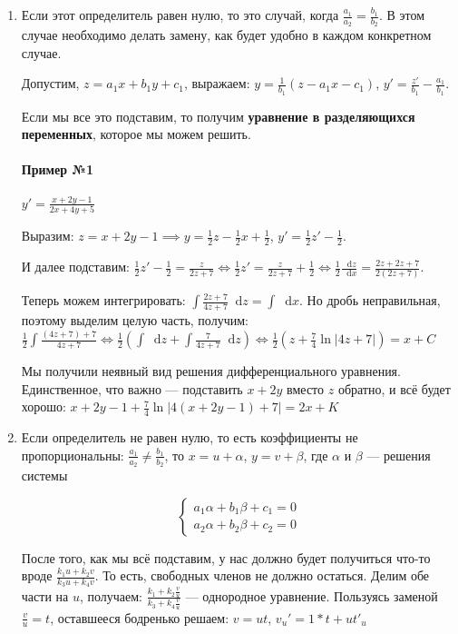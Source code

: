 \documentclass{article}
\newcommand*\diff{\mathop{}\!\mathrm{d}}
\begin{document}
\begin{enumerate}
    \item Если этот определитель равен нулю, то это случай, когда $\frac{a_1}{a_2} = \frac{b_1}{b_2}$. В этом случае необходимо делать замену, как будет удобно в каждом конкретном случае.
    
    Допустим, $z = a_1 x + b_1 y + c_1$, выражаем: $y = \frac{1}{b_1} (z - a_1 x - c_1)$, $y' = \frac{z'}{b_1} - \frac{a_1}{b_1}$. 
    
    Если мы все это подставим, то получим \textbf{уравнение в разделяющихся переменных}, которое мы можем решить.

    \paragraph{Пример №1} $y' = \frac{x + 2y - 1}{2x + 4y + 5}$

    Выразим: $z = x + 2y - 1 \implies y = \frac{1}{2} z - \frac{1}{2} x + \frac{1}{2}$, $y' = \frac{1}{2} z' - \frac{1}{2}$. 
    
    И далее подставим: $\frac{1}{2} z' - \frac{1}{2} = \frac{z}{2z + 7} \Longleftrightarrow \frac{1}{2} z' = \frac{z}{2z + 7} + \frac{1}{2} \Longleftrightarrow \frac{1}{2} \frac{\diff z}{\diff x} = \frac{2z + 2z + 7}{2 (2z + 7)}$.

    Теперь можем интегрировать: $\int \frac{2 z + 7}{4 z + 7} \diff z = \int \diff x$. Но дробь неправильная, поэтому выделим целую часть, получим: $\frac{1}{2} \int \frac{(4z + 7) + 7}{4z + 7} \Longleftrightarrow \frac{1}{2} (\int \diff z + \int \frac{7}{4z + 7} \diff z) \Longleftrightarrow \frac{1}{2} (z + \frac{7}{4} \ln |4z + 7|) = x + C$

    Мы получили неявный вид решения дифференциального уравнения. Единственное, что важно — подставить $x + 2y$ вместо $z$ обратно, и всё будет хорошо: $x + 2y - 1 + \frac{7}{4} \ln |4 (x + 2y - 1) + 7| = 2x + K$
    \item Если определитель не равен нулю, то есть коэффициенты не пропорциональны: $\frac{a_1}{a_2} \ne \frac{b_1}{b_2}$, то $x = u + \alpha$, $y = v + \beta$, где $\alpha$ и $\beta$ — решения системы
    
    $$\begin{cases}
        a_1 \alpha + b_1 \beta + c_1 = 0 \\
        a_2 \alpha + b_2 \beta + c_2 = 0
    \end{cases}$$

    После того, как мы всё подставим, у нас должно будет получиться что-то вроде $\frac{k_1 u + k_2 v}{k_3 u + k_4 v}$. То есть, свободных членов не должно остаться. Делим обе части на $u$, получаем: $\frac{k_1 + k_2 \frac{v}{u}}{k_3 + k_4 \frac{v}{u}}$ — однородное уравнение. Пользуясь заменой $\frac{v}{u} = t$, оставшееся бодренько решаем: $v = ut$, $v_u' = 1 * t + ut'_u$


\end{enumerate}
\end{document}
